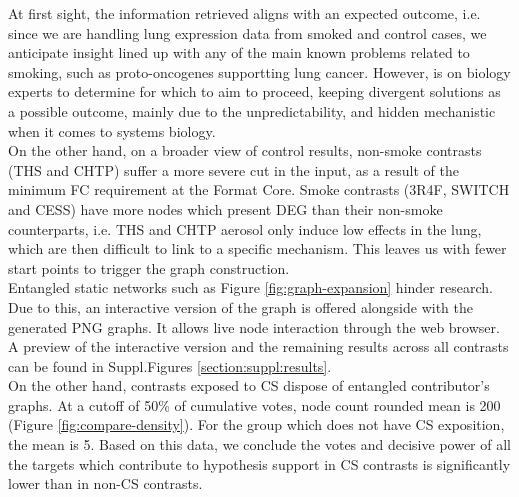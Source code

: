 At first sight, the information retrieved aligns with an expected outcome, i.e. since we are handling lung expression data from smoked and control cases, we anticipate insight lined up with any of the main known problems related to smoking, such as proto-oncogenes supportting lung cancer. However, is on biology experts to determine for which to aim to proceed, keeping divergent solutions as a possible outcome, mainly due to the unpredictability, and hidden mechanistic when it comes to systems biology.
\\

On the other hand, on a broader view of control results, non-smoke contrasts (THS and  CHTP) suffer a more severe cut in the input, as a result of the minimum FC requirement at the Format Core. Smoke contrasts (3R4F, SWITCH and CESS) have more nodes which present DEG than their non-smoke counterparts, i.e. THS and CHTP aerosol only induce low effects in the lung, which are then difficult to link to a specific mechanism. This leaves us with fewer start points to trigger the graph construction.
\\

Entangled static networks such as Figure \ref{fig:graph-expansion} hinder research. Due to this, an interactive version of the graph is offered alongside with the generated PNG graphs. It allows live node interaction through the web browser. A preview of the interactive version and the remaining results across all contrasts can be found in Suppl.Figures \ref{section:suppl:results}.
\\

On the other hand, contrasts exposed to CS dispose of entangled contributor’s graphs. At a cutoff of 50\% of cumulative votes, node count rounded mean is 200 (Figure \ref{fig:compare-density}). For the group which does not have CS exposition, the mean is 5. Based on this data, we conclude the votes and decisive power of all the targets which contribute to hypothesis support in CS contrasts is significantly lower than in non-CS contrasts.
\\

